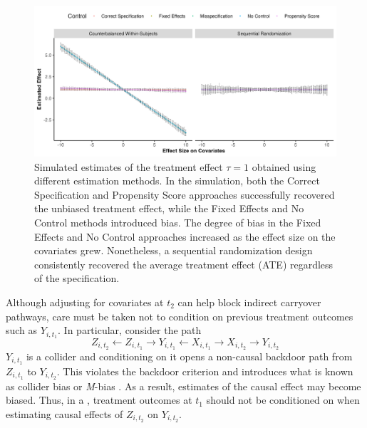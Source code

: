 \begin{figure}[h]
    \centering
    \includegraphics[width=0.95\linewidth]{Figures/Design_Comparison.png}
    \caption{Simulated estimates of the treatment effect \(\tau = 1\) obtained using different estimation methods. In the \cwsd{} simulation, both the Correct Specification and Propensity Score approaches successfully recovered the unbiased treatment effect, while the Fixed Effects and No Control methods introduced bias. The degree of bias in the Fixed Effects and No Control approaches increased as the effect size on the covariates grew. Nonetheless, a sequential randomization design consistently recovered the average treatment effect (ATE) regardless of the specification.}
    \label{fig:simulation_cwsd}
\end{figure}

Although adjusting for covariates at $t_2$ can help block indirect carryover pathways, care must be taken not to condition on previous treatment outcomes such as \( Y_{i,t_1} \). In particular, consider the path \[ Z_{i,t_2} \leftarrow Z_{i,t_1} \rightarrow Y_{i,t_1} \leftarrow X_{i,t_1} \rightarrow X_{i,t_2} \rightarrow Y_{i,t_2} \] $Y_{i, t_1}$ is a collider and conditioning on it opens a non-causal backdoor path from \( Z_{i,t_1} \) to \( Y_{i,t_2} \). This violates the backdoor criterion and introduces what is known as collider bias or \textit{M}-bias \citep{21_M_Bias, 22_good_and_bad_crtl}. As a result, estimates of the causal effect may become biased. Thus, in a \cwsd{}, treatment outcomes at $t_1$ should not be conditioned on when estimating causal effects of \( Z_{i,t_2} \) on $Y_{i,t_2}$.